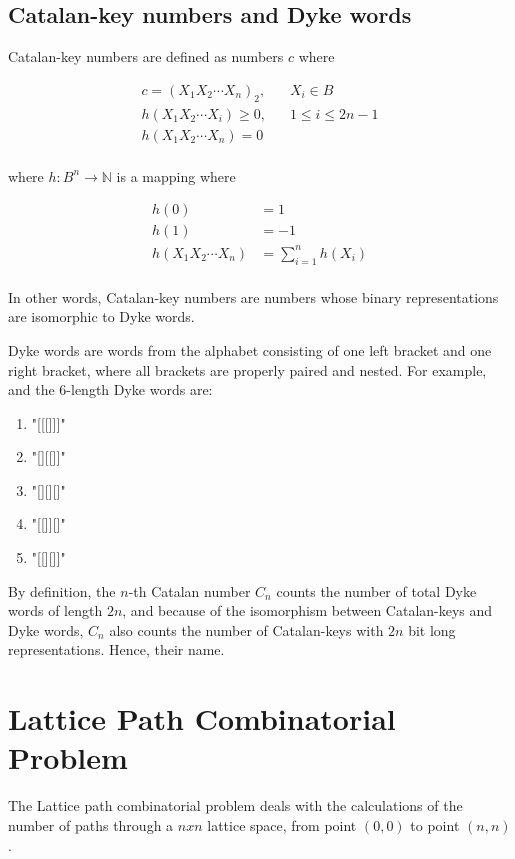 \documentclass[12pt]{article} %
\begin{document}
\subsection{Catalan-key numbers and Dyke words}

Catalan-key numbers are defined as numbers $c$ where

\begin{align*}
    c = (X_1 X_2 \cdots X_n)_2, & \; \; \; X_i \in B \\
    h(X_1 X_2 \cdots X_i) \geq 0, & \; \; \;  1 \leq i \leq 2n-1 \\
    h(X_1 X_2 \cdots X_n) = 0 & \\
\end{align*}

where $h: B^n \to \mathbb{N}$ is a mapping where

\begin{align*}
    h(0) &= 1 \\
    h(1) &= -1 \\
    h(X_1 X_2 \cdots X_n) &= \sum_{i=1}^{n} h(X_i) \\
\end{align*}

In other words, Catalan-key numbers are numbers whose binary representations are isomorphic to Dyke words.

Dyke words are words from the alphabet consisting of one left bracket and one right bracket, where all brackets are properly paired and nested. For example, and the 6-length Dyke words are:
\begin{enumerate}
    \item "[[[]]]"
    \item "[][[]]"
    \item "[][][]"
    \item "[[]][]"
    \item "[[][]]"
\end{enumerate}


By definition, the $n$-th Catalan number $C_n$ counts the number of total Dyke words of length $2n$, and because of the isomorphism between Catalan-keys and Dyke words, $C_n$ also counts the number of Catalan-keys with $2n$ bit long representations.  Hence, their name.

\section{Lattice Path Combinatorial Problem} 

The Lattice path combinatorial problem deals with the calculations of the number of paths through a $n x n$ lattice space, from point $(0,0)$ to point $(n,n)$. 
\end{document}
